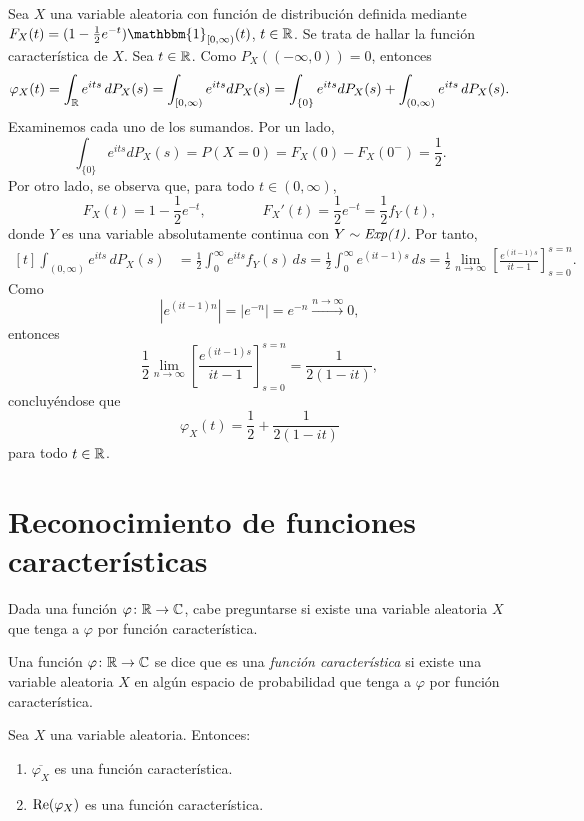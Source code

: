 \documentclass[a4paper, 11pt, extrafontsizes]{memoir}
\begin{document}
\begin{example}
    Sea $X$ una variable aleatoria con función de distribución definida mediante $F_X(t) = (1-\frac{1}{2}e^{-t})\mathbbm{1}_{[0,\infty)}(t)$, $t \in \mathbb R$. Se trata de hallar la función característica de $X$. Sea $t \in \mathbb R$. Como $P_X((-\infty,0)) = 0$, entonces
    \[\varphi_X(t) = \int_\mathbb R e^{its} \, dP_X(s) = \int_{[0,\infty)} e^{its} dP_X(s) = \int_{\{0\}}e^{its}dP_X(s) + \int_{(0,\infty)}e^{its} \, dP_X(s).\]
    Examinemos cada uno de los sumandos. Por un lado, 
    \[\int_{\{0\}}e^{its}dP_X(s) = P(X = 0) = F_X(0) - F_X(0^-) = \frac{1}{2}.\]
    Por otro lado, se observa que, para todo $t \in (0,\infty)$,
    \[F_X(t)=1-\frac{1}{2}e^{-t}, \qquad \qquad F_X'(t) = \frac{1}{2}e^{-t} = \frac{1}{2}f_Y(t),\]
    donde $Y$ es una variable absolutamente continua con $Y \sim \textup{\emph{Exp(1)}}$. Por tanto,
    \[\begin{aligned}[t]
        \int_{(0,\infty)}e^{its} \, dP_X(s) &= \frac{1}{2}\int_0^\infty e^{its} f_Y(s) \, ds = \frac{1}{2}\int_0^\infty e^{(it-1)s} \, ds = \frac{1}{2}\lim_{n \to \infty}\left[\frac{e^{(it-1)s}}{it-1}\right]_{s=0}^{s=n}.
    \end{aligned}\]
    Como
    \[|e^{(it-1)n}| = |e^{-n}| = e^{-n} \xrightarrow{n \to \infty} 0,\]
    entonces
    \[\frac{1}{2}\lim_{n \to \infty}\left[\frac{e^{(it-1)s}}{it-1}\right]_{s=0}^{s=n} = \frac{1}{2(1-it)},\]
    concluyéndose que
    \[\varphi_X(t) = \frac{1}{2}+\frac{1}{2(1-it)}\]
    para todo $t \in \mathbb R$.
\end{example}

\section{Reconocimiento de funciones características}

Dada una función $\varphi \colon \mathbb R \to \mathbb C$, cabe preguntarse si existe una variable aleatoria $X$ que tenga a $\varphi$ por función característica.

\begin{definition}
    Una función $\varphi \colon \mathbb R \to \mathbb C$ se dice que es una \emph{función característica} si existe una variable aleatoria $X$ en algún espacio de probabilidad que tenga a $\varphi$ por función característica.
\end{definition}

\begin{proposition}
    Sea $X$ una variable aleatoria. Entonces:
    \begin{enumerate}
        \item $\overline{\varphi_X}$ es una función característica.
        \item $\textup{Re}(\varphi_X)$ es una función característica.
    \end{enumerate}
\end{proposition}
\end{document}

